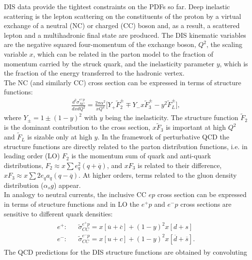 DIS data provide the tightest constraints on the PDFs so far.
Deep inelastic scattering is the lepton scattering on the 
constituents of the proton by a virtual exchange of a neutral (NC) 
or charged (CC) boson and, as a result, a scattered lepton and a 
multihadronic final state are produced.
The DIS kinematic variables are the negative squared four-momentum of 
the exchange boson, $Q^2$, the 
scaling variable $x$, which can be related in the parton model to 
the fraction of momentum carried by the struck quark, and the 
inelasticity parameter $y$, which is the fraction of the energy 
transferred to the hadronic vertex. 
\\
%
The NC (and similarly CC) cross section can be expressed in terms of structure functions:
\begin{eqnarray}
   \frac{d^2\sigma_{NC}^{e^{\pm} p}}{dxdQ^2}=\frac{2\pi\alpha^2}{xQ^4} 
     \big [ Y_{+} \tilde F_2^{\pm} \mp Y_{-}x \tilde F_3^{\pm} - y^2 \tilde F_L^{\pm} \big ],
\end{eqnarray}
where $Y_{\pm} = 1 \pm (1-y)^2$ with $y$ being the inelasticity. The structure function $\tilde F_2$
is the dominant contribution to the cross section, $x \tilde F_3$ is important at high $Q^2$ and $\tilde F_L$ is sizable 
only at high $y$. 
In the framework of perturbative QCD the structure functions are directly related to the 
parton distribution functions, i.e. in leading order (LO)  $F_2$ is the momentum sum of quark and anti-quark distributions, 
$F_2 \approx x \sum e^2_q (q+ \overline q)$, and $xF_3$ is related to their difference, 
    $xF_3 \approx x \sum 2e_q a_q (q- \overline q)$. At higher orders, terms related to the gluon density distribution
($\alpha_s g$) appear.
\\
In analogy to neutral currents, the inclusive CC $ep$ cross section can be expressed 
in terms of structure functions and in LO the $e^+p$ and $e^-p$ cross sections are sensitive to different quark 
densities:
\begin{eqnarray}
    \begin{array}{rll}
   e^{+}:  & & \tilde \sigma_{CC}^{e^{+} p} = 
                x[\overline u +\overline c] + (1-y)^2 x[ d+s ]  \\
   e^{-}:  & & \tilde \sigma_{CC}^{e^{-} p} = 
                x[ u +c] + (1-y)^2 x[\overline d +\overline s ].
    \end{array}
\end{eqnarray}
%
The QCD predictions for the DIS structure functions are obtained by convoluting 
